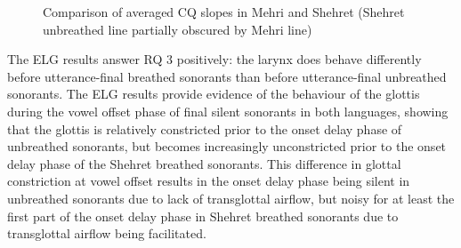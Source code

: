 \documentclass[output=paper]{langscibook}
\begin{document}
\begin{figure}
\caption{Comparison of averaged CQ slopes in Mehri and Shehret (Shehret unbreathed line partially obscured by Mehri line)}
\label{fig:watson:26}
\end{figure}

The ELG results answer RQ 3 positively: {the larynx does behave differently before utterance-final breathed sonorants than before utterance-final unbreathed sonorants.} The ELG results provide evidence of the behaviour of the glottis during the vowel offset phase of final silent sonorants in both languages, showing that the glottis is relatively constricted prior to the onset delay phase of unbreathed sonorants, but becomes increasingly unconstricted prior to the onset delay phase of the Shehret breathed sonorants. This difference in glottal constriction at vowel offset results in the onset delay phase being silent in unbreathed sonorants due to lack of transglottal airflow, but noisy for at least the first part of the onset delay phase in Shehret breathed sonorants due to transglottal airflow being facilitated.
\end{document}
